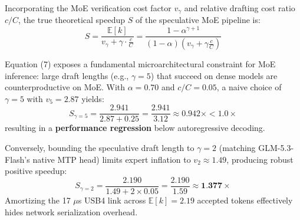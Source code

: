 \documentclass[11pt,a4paper]{article}
\begin{document}
Incorporating the MoE verification cost factor $v_\gamma$ and relative drafting cost ratio $c/C$, the true theoretical speedup $S$ of the speculative MoE pipeline is:
\begin{equation}
    S = \frac{\mathbb{E}[k]}{v_\gamma + \gamma \cdot \frac{c}{C}} = \frac{1 - \alpha^{\gamma+1}}{(1 - \alpha)\left(v_\gamma + \gamma \frac{c}{C}\right)}
\end{equation}

Equation (7) exposes a fundamental microarchitectural constraint for MoE inference: large draft lengths (e.g., $\gamma=5$) that succeed on dense models are counterproductive on MoE. With $\alpha=0.70$ and $c/C=0.05$, a naive choice of $\gamma=5$ with $v_5=2.87$ yields:
\begin{equation}
    S_{\gamma=5} = \frac{2.941}{2.87 + 0.25} = \frac{2.941}{3.12} \approx 0.942\times < 1.0\times
\end{equation}
resulting in a \textbf{performance regression} below autoregressive decoding. 

Conversely, bounding the speculative draft length to $\gamma=2$ (matching GLM-5.3-Flash's native MTP head) limits expert inflation to $v_2 \approx 1.49$, producing robust positive speedup:
\begin{equation}
    S_{\gamma=2} = \frac{2.190}{1.49 + 2 \times 0.05} = \frac{2.190}{1.59} \approx \textbf{1.377}\times
\end{equation}
Amortizing the 17 $\mu$s USB4 link across $\mathbb{E}[k] = 2.19$ accepted tokens effectively hides network serialization overhead.
\end{document}
